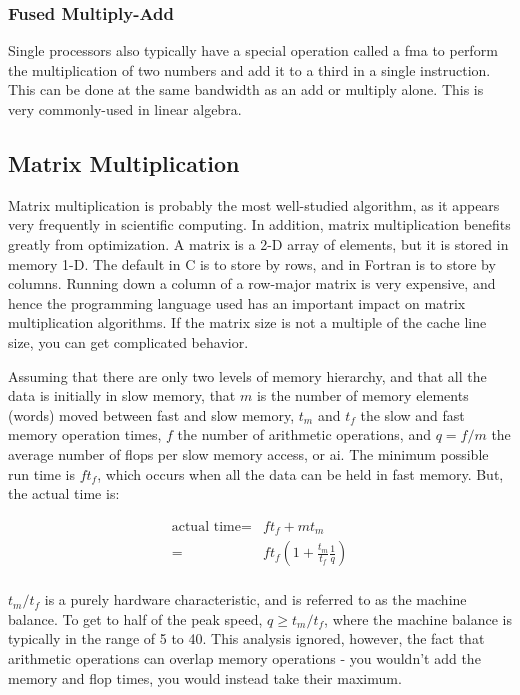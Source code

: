 \documentclass[10pt]{article}
\begin{document}
\begin{flushleft}
\subsubsection{Fused Multiply-Add}

Single processors also typically have a special operation called a \gls{fma} to perform the multiplication of two numbers and add it to a third in a single instruction. This can be done at the same bandwidth as an add or multiply alone. This is very commonly-used in linear algebra.

\subsection{Matrix Multiplication}

Matrix multiplication is probably the most well-studied algorithm, as it appears very frequently in scientific computing. In addition, matrix multiplication benefits greatly from optimization. A matrix is a 2-D array of elements, but it is stored in memory 1-D. The default in C is to store by rows, and in Fortran is to store by columns. Running down a column of a row-major matrix is very expensive, and hence the programming language used has an important impact on matrix multiplication algorithms. If the matrix size is not a multiple of the cache line size, you can get complicated behavior.

Assuming that there are only two levels of memory hierarchy, and that all the data is initially in slow memory, that \(m\) is the number of memory elements (words) moved between fast and slow memory, \(t_m\) and \(t_f\) the slow and fast memory operation times, \(f\) the number of arithmetic operations, and \(q=f/m\) the average number of flops per slow memory access, or \gls{ai}. The minimum possible run time is \(ft_f\), which occurs when all the data can be held in fast memory. But, the actual time is:

\begin{equation}
\begin{aligned}
\textrm{actual time}=& ft_f+mt_m\\
=& ft_f\left(1+\frac{t_m}{t_f}\frac{1}{q}\right)\\
\end{aligned}
\end{equation}

\(t_m/t_f\) is a purely hardware characteristic, and is referred to as the machine balance. To get to half of the peak speed, \(q\geq t_m/t_f\), where the machine balance is typically in the range of 5 to 40. This analysis ignored, however, the fact that arithmetic operations can overlap memory operations - you wouldn't add the memory and flop times, you would instead take their maximum.


\end{flushleft}
\end{document}

